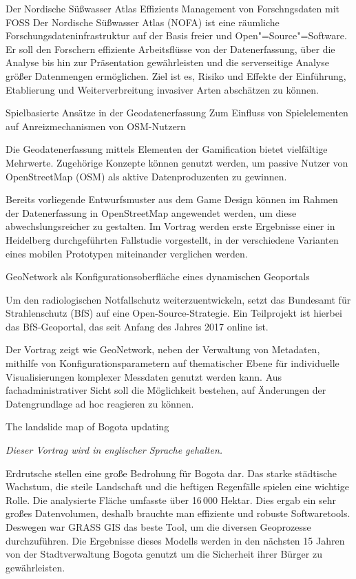 %
{Der Nordische Süßwasser Atlas}%
{Effizients Management von Forschngsdaten mit FOSS}%
{%
Der Nordische Süßwasser Atlas (NOFA) ist eine räumliche
Forschungsdateninfrastruktur auf der Basis freier und Open"=Source"=Software.
Er soll den Forschern effiziente Arbeitsflüsse von der Datenerfassung, über
die Analyse bis hin zur Präsentation gewährleisten und die serverseitige
Analyse größer Datenmengen ermöglichen. Ziel ist es, Risiko und Effekte der
Einführung, Etablierung und Weiterverbreitung invasiver Arten abschätzen zu
können.%
}

%
{Spielbasierte Ansätze in der Geodatenerfassung}%
{Zum Einfluss von Spielelementen auf \mbox{Anreizmechanismen} von OSM-Nutzern}%
{%
Die Geodatenerfassung mittels Elementen der Gamification bietet vielfältige
Mehrwerte. Zugehörige Konzepte können genutzt werden, um passive Nutzer von
OpenStreetMap (OSM) als aktive Datenproduzenten zu gewinnen.

Bereits vorliegende Entwurfsmuster aus dem Game Design können im Rahmen der
Datenerfassung in OpenStreetMap angewendet werden, um diese abwechslungsreicher zu
gestalten. Im Vortrag werden erste Ergebnisse einer in Heidelberg
durchgeführten Fallstudie vorgestellt, in der verschiedene Varianten eines
mobilen Prototypen miteinander verglichen werden.%
}

%
{GeoNetwork als Konfigurationsoberfläche eines dynamischen Geoportals}%
{}%
{%
Um den radiologischen Notfallschutz weiterzuentwickeln, setzt das Bundesamt für
Strahlenschutz (BfS) auf eine Open-Source-Strategie. Ein Teilprojekt ist
hierbei das BfS-Geoportal, das seit Anfang des Jahres 2017 online ist.

Der Vortrag zeigt wie GeoNetwork, neben der Verwaltung von Metadaten, mithilfe
von Konfigurationsparametern auf thematischer Ebene für individuelle
Visualisierungen komplexer Messdaten genutzt werden kann. Aus
fachadministrativer Sicht soll die Möglichkeit bestehen, auf Änderungen der
Datengrundlage ad hoc reagieren zu können.%
}

%
{The landslide map of Bogota updating}%
{}%
{%
  \emph{Dieser Vortrag wird in englischer Sprache gehalten.}

  \begin{otherlanguage}{english}
    Erdrutsche stellen eine große Bedrohung für Bogota dar. Das starke städtische
    Wachstum, die steile Landschaft und die heftigen Regenfälle spielen eine
    wichtige Rolle. Die analysierte Fläche umfasste über 16\,000 Hektar. Dies ergab
    ein sehr großes Datenvolumen, deshalb brauchte man effiziente und robuste
    Softwaretools. Des\-wegen war GRASS GIS das beste Tool, um die diversen
    Geoprozesse durchzuführen. Die Ergebnisse dieses Modells werden in den nächsten
    15 Jahren von der Stadtverwaltung Bogota genutzt um die Sicherheit ihrer Bürger
    zu gewährleisten.%
  \end{otherlanguage}
}

